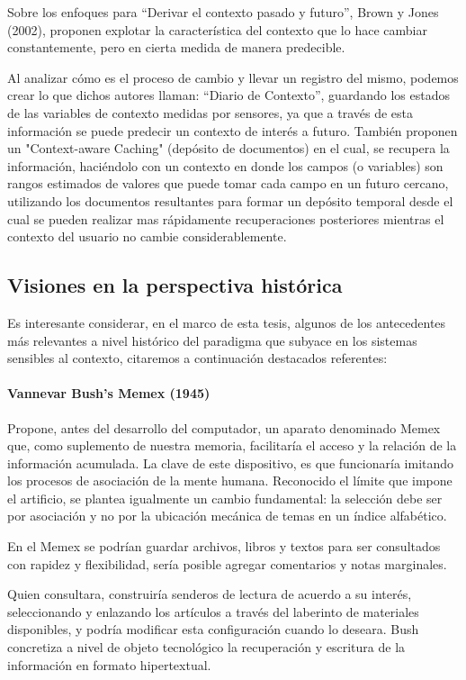 Sobre los enfoques para “Derivar el contexto pasado y futuro”, Brown y Jones
(2002), proponen explotar la característica del contexto que lo hace cambiar constantemente,
pero en cierta medida de manera predecible.

Al analizar cómo es el proceso de cambio y llevar un registro del mismo, podemos crear lo que dichos autores llaman: “Diario de Contexto”, guardando los estados de las variables de contexto medidas por sensores, ya que a través de esta información se puede predecir un contexto de interés a futuro. También proponen un "Context-aware
Caching" (depósito de documentos) en el cual, se recupera la información, haciéndolo con un contexto en donde los campos (o variables) son rangos estimados de valores que puede tomar cada campo en un futuro cercano, utilizando los documentos resultantes para formar un depósito temporal desde el cual se pueden realizar mas rápidamente
recuperaciones posteriores mientras el contexto del usuario no cambie considerablemente.

\subsection {Visiones en la perspectiva histórica}
 
Es interesante considerar, en el marco de esta tesis, algunos de los
antecedentes más relevantes a nivel histórico del paradigma que subyace en los sistemas sensibles al
contexto, citaremos a continuación destacados referentes:

\paragraph {Vannevar Bush's Memex (1945)}

Propone, antes del desarrollo del computador, un aparato denominado Memex que, como suplemento de nuestra memoria, facilitaría el acceso y la relación de la información acumulada. La clave de este dispositivo, es que funcionaría imitando los procesos de asociación de la mente humana. Reconocido el límite que impone el artificio, se plantea
igualmente un cambio fundamental: la selección debe ser por asociación y no por la ubicación mecánica de temas en un índice alfabético.

En el Memex se podrían guardar archivos, libros y textos para ser consultados con rapidez y flexibilidad, sería posible agregar comentarios y notas marginales.

Quien consultara, construiría senderos de lectura de acuerdo a su interés,
seleccionando y enlazando los artículos a través del laberinto de materiales disponibles, y podría
modificar esta configuración cuando lo deseara. Bush concretiza a nivel de objeto tecnológico la recuperación y escritura de la información en formato hipertextual.


